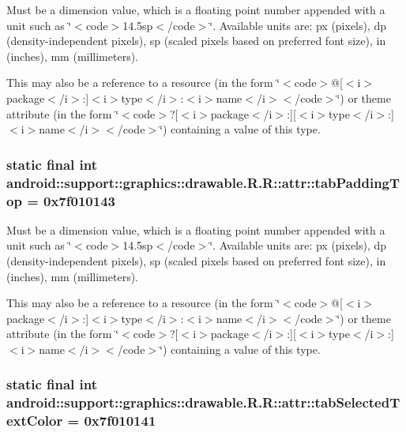 Must be a dimension value, which is a floating point number appended with a unit such as \char`\"{}$<$code$>$14.5sp$<$/code$>$\char`\"{}. Available units are: px (pixels), dp (density-independent pixels), sp (scaled pixels based on preferred font size), in (inches), mm (millimeters). 

This may also be a reference to a resource (in the form \char`\"{}$<$code$>$@\mbox{[}$<$i$>$package$<$/i$>$:\mbox{]}$<$i$>$type$<$/i$>$:$<$i$>$name$<$/i$>$$<$/code$>$\char`\"{}) or theme attribute (in the form \char`\"{}$<$code$>$?\mbox{[}$<$i$>$package$<$/i$>$:\mbox{]}\mbox{[}$<$i$>$type$<$/i$>$:\mbox{]}$<$i$>$name$<$/i$>$$<$/code$>$\char`\"{}) containing a value of this type. \hypertarget{classandroid_1_1support_1_1graphics_1_1drawable_1_1_r_1_1attr_848f0f790a22eb9d114525981326c7cb}{
\subsubsection[{tabPaddingTop}]{\setlength{\rightskip}{0pt plus 5cm}static final int android::support::graphics::drawable.R.R::attr::tabPaddingTop = 0x7f010143}}
\label{classandroid_1_1support_1_1graphics_1_1drawable_1_1_r_1_1attr_848f0f790a22eb9d114525981326c7cb}


Must be a dimension value, which is a floating point number appended with a unit such as \char`\"{}$<$code$>$14.5sp$<$/code$>$\char`\"{}. Available units are: px (pixels), dp (density-independent pixels), sp (scaled pixels based on preferred font size), in (inches), mm (millimeters). 

This may also be a reference to a resource (in the form \char`\"{}$<$code$>$@\mbox{[}$<$i$>$package$<$/i$>$:\mbox{]}$<$i$>$type$<$/i$>$:$<$i$>$name$<$/i$>$$<$/code$>$\char`\"{}) or theme attribute (in the form \char`\"{}$<$code$>$?\mbox{[}$<$i$>$package$<$/i$>$:\mbox{]}\mbox{[}$<$i$>$type$<$/i$>$:\mbox{]}$<$i$>$name$<$/i$>$$<$/code$>$\char`\"{}) containing a value of this type. \hypertarget{classandroid_1_1support_1_1graphics_1_1drawable_1_1_r_1_1attr_baa9a876b28599cd8844d65e13a499f4}{
\subsubsection[{tabSelectedTextColor}]{\setlength{\rightskip}{0pt plus 5cm}static final int android::support::graphics::drawable.R.R::attr::tabSelectedTextColor = 0x7f010141}}
\label{classandroid_1_1support_1_1graphics_1_1drawable_1_1_r_1_1attr_baa9a876b28599cd8844d65e13a499f4}



